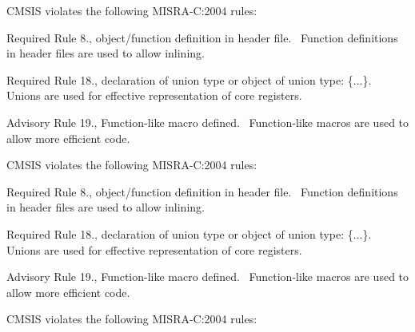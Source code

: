 CMSIS violates the following MISRA-\/C\+:2004 rules\+:

\begin{DoxyItemize}
\item Required Rule 8., object/function definition in header file.~\newline
 Function definitions in header files are used to allow \textquotesingle{}inlining\textquotesingle{}.\end{DoxyItemize}
\begin{DoxyItemize}
\item Required Rule 18., declaration of union type or object of union type\+: \textquotesingle{}\{...\}\textquotesingle{}.~\newline
 Unions are used for effective representation of core registers.\end{DoxyItemize}
\begin{DoxyItemize}
\item Advisory Rule 19., Function-\/like macro defined.~\newline
 Function-\/like macros are used to allow more efficient code.\end{DoxyItemize}


CMSIS violates the following MISRA-\/C\+:2004 rules\+:

\begin{DoxyItemize}
\item Required Rule 8., object/function definition in header file.~\newline
 Function definitions in header files are used to allow \textquotesingle{}inlining\textquotesingle{}.\end{DoxyItemize}
\begin{DoxyItemize}
\item Required Rule 18., declaration of union type or object of union type\+: \textquotesingle{}\{...\}\textquotesingle{}.~\newline
 Unions are used for effective representation of core registers.\end{DoxyItemize}
\begin{DoxyItemize}
\item Advisory Rule 19., Function-\/like macro defined.~\newline
 Function-\/like macros are used to allow more efficient code.\end{DoxyItemize}


CMSIS violates the following MISRA-\/C\+:2004 rules\+:

